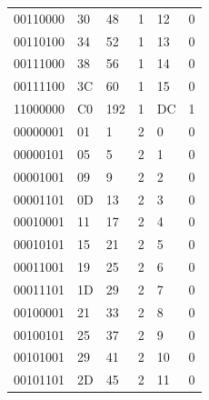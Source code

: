 \documentclass[12pt,a4paper]{report}
\begin{document}
\begin{table}[]
\begin{tabular}{llllll}
00110000                                               & 30        & 48            & 1      & 12     & 0       \\
00110100                                               & 34        & 52            & 1      & 13     & 0       \\
00111000                                               & 38        & 56            & 1      & 14     & 0       \\
00111100                                               & 3C        & 60            & 1      & 15     & 0       \\
11000000                                               & C0        & 192           & 1      & DC     & 1       \\
00000001                                               & 01        & 1             & 2      & 0      & 0       \\
00000101                                               & 05        & 5             & 2      & 1      & 0       \\
00001001                                               & 09        & 9             & 2      & 2      & 0       \\
00001101                                               & 0D        & 13            & 2      & 3      & 0       \\
00010001                                               & 11        & 17            & 2      & 4      & 0       \\
00010101                                               & 15        & 21            & 2      & 5      & 0       \\
00011001                                               & 19        & 25            & 2      & 6      & 0       \\
00011101                                               & 1D        & 29            & 2      & 7      & 0       \\
00100001                                               & 21        & 33            & 2      & 8      & 0       \\
00100101                                               & 25        & 37            & 2      & 9      & 0       \\
00101001                                               & 29        & 41            & 2      & 10     & 0       \\
00101101                                               & 2D        & 45            & 2      & 11     & 0       \\

\end{tabular}
\end{table}
\end{document}
